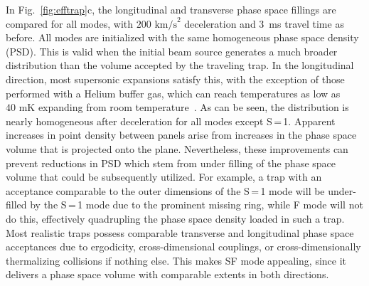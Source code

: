 \documentclass[%
 reprint,
 amsmath,amssymb,
 aps,
prl,
]{revtex4-1}
\begin{document}
In Fig.~\ref{fig:efftrap}c, the longitudinal and transverse phase space fillings are compared for all modes, with $200\text{ km/s}^2$ deceleration and $3$~ms travel time as before. 
All modes are initialized with the same homogeneous phase space density (PSD).
This is valid when the initial beam source generates a much broader distribution than the volume accepted by the traveling trap.
In the longitudinal direction, most supersonic expansions satisfy this, with the exception of those performed with a Helium buffer gas, which can reach temperatures as low as $40\text{ mK}$ expanding from room temperature~\cite{Even2014}.
As can be seen, the distribution is nearly homogeneous after deceleration for all modes except S\,=\,1.
Apparent increases in point density between panels arise from increases in the phase space volume that is projected onto the plane.
Nevertheless, these improvements can prevent reductions in PSD which stem from under filling of the phase space volume that could be subsequently utilized.
For example, a trap with an acceptance comparable to the outer dimensions of the S\,=\,1 mode will be under-filled by the S\,=\,1 mode due to the prominent missing ring, while F mode will not do this, effectively quadrupling the phase space density loaded in such a trap.
Most realistic traps possess comparable transverse and longitudinal phase space acceptances due to ergodicity, cross-dimensional couplings, or cross-dimensionally thermalizing collisions if nothing else.
This makes SF mode appealing, since it delivers a phase space volume with comparable extents in both directions.
\end{document}
